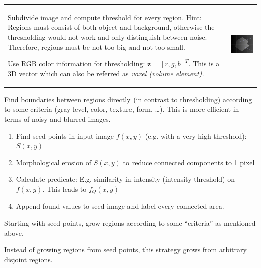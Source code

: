       \begin{tabular}{ll}
        \parbox{13cm}{
          Subdivide image and compute threshold for every region. Hint: 
          Regions must consist of both object and background, otherwise the thresholding would not 
          work and only distinguish between noise. Therefore, regions must be not too big and not too small.
      
      Use RGB color information for thresholding: $\bm z = [r, g, b]^T$. This is a 3D vector which 
      can also be referred as \em voxel \em (volume element).
      }
        & \parbox{6cm}{\includegraphics[width=5cm]{./images/adaptive_thresholding.png}}
      \end{tabular}

    Find boundaries between regions directly (in contrast to thresholding) according to some
    criteria (gray level, color, texture, form, \ldots). This is more efficient in terms of noisy
    and blurred images.
  
      \begin{enumerate}
      	\item Find seed points in input image $f(x,y)$ (e.g. with a very high threshold): $S(x,y)$
      	\item Morphological erosion of $S(x,y)$ to reduce connected components to 1 pixel
      	\item Calculate predicate: E.g. similarity in intensity (intensity threshold) on $f(x,y)$. 
      	  This leads to $f_Q(x,y)$ 
      	\item Append found values to seed image and label every connected area.
      \end{enumerate}
      Starting with seed points, grow regions according to some ``criteria'' as mentioned above.
    
    
      Instead of growing regions from seed points, this strategy grows from arbitrary disjoint regions.
      
